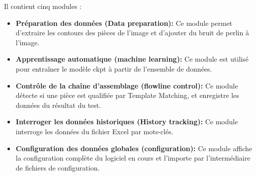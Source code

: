 Il contient cinq modules : 
\begin{itemize}
    \item \textbf{Préparation des données (Data preparation): }Ce module permet d'extraire les contours des pièces de l'image et d'ajouter du bruit de perlin à l'image. 
    \item \textbf{Apprentissage automatique (machine learning): }Ce module est utilisé pour entraîner le modèle ckpt à partir de l'ensemble de données.
    \item \textbf{Contrôle de la chaîne d'assemblage (flowline control): } Ce module détecte si une pièce est qualifiée par Template Matching, et enregistre les données du résultat du test.
    \item \textbf{Interroger les données historiques  (History tracking): }Ce module interroge les données du fichier Excel par mots-clés.
    \item \textbf{Configuration des données globales (configuration): }Ce module affiche la configuration complète du logiciel en cours et l'importe par l'intermédiaire de fichiers de configuration.
\end{itemize}